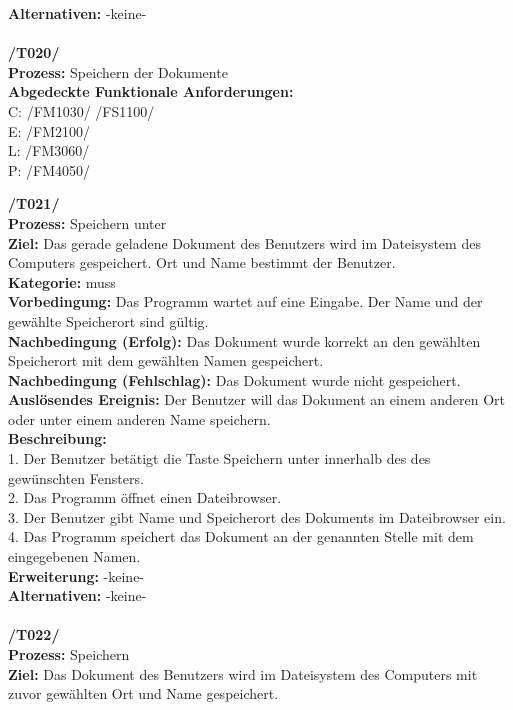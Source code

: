 \documentclass[a4paper]{scrreprt}
\begin{document}
\textbf {Alternativen:} -keine- \\ \\
\textbf{/T020/} \\ 
\textbf{Prozess: }Speichern der Dokumente\\
\textbf{Abgedeckte Funktionale Anforderungen:}\\
C: /FM1030/ /FS1100/\\
E: /FM2100/	\\
L: /FM3060/ \\
P: /FM4050/\\
\begin{addmargin}[15pt]{0pt}
\textbf{/T021/} \\ 
\textbf{Prozess: }Speichern unter\\
\textbf{Ziel:} Das gerade geladene Dokument des Benutzers wird im Dateisystem des Computers gespeichert. Ort und Name bestimmt der Benutzer.\\
\textbf{Kategorie:} muss\\
\textbf{Vorbedingung:} Das Programm wartet auf eine Eingabe. Der Name und der gewählte Speicherort sind gültig.\\
\textbf{Nachbedingung (Erfolg):} Das Dokument wurde korrekt an den gewählten Speicherort mit dem gewählten Namen gespeichert.  \\
\textbf{Nachbedingung (Fehlschlag):} Das Dokument wurde nicht gespeichert. \\
\textbf{Auslösendes Ereignis:} Der Benutzer will das Dokument an einem anderen Ort oder unter einem anderen Name speichern.\\
\textbf{Beschreibung:} \\
1. Der Benutzer betätigt die Taste Speichern unter innerhalb des des gewünschten Fensters.\\
2. Das Programm öffnet einen Dateibrowser.\\
3. Der Benutzer gibt Name und Speicherort des Dokuments im Dateibrowser ein.
4. Das Programm speichert das Dokument an der genannten Stelle mit dem eingegebenen Namen. \\
\textbf {Erweiterung:} -keine- \\
\textbf {Alternativen:} -keine- \\ \\
\textbf{/T022/} \\ 
\textbf{Prozess: }Speichern\\
\textbf{Ziel:} Das Dokument des Benutzers wird im Dateisystem des Computers mit zuvor gewählten Ort und Name gespeichert.\\

\end{addmargin}
\end{document}
